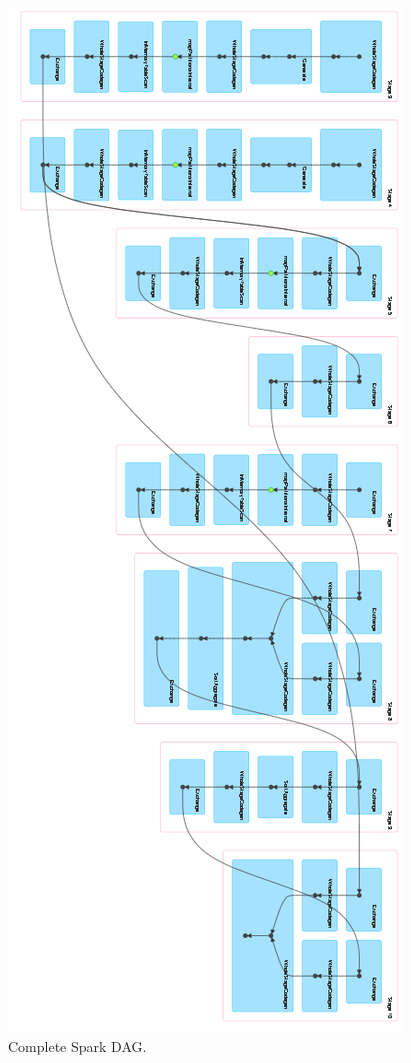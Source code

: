 \newpage
\begin{figure}[H]
	\centering
	\includegraphics[scale=0.8]{images/3-spark/spark-DAG.png}
	\caption{Complete Spark DAG.}
	\label{fig:spark-DAG}
\end{figure}

